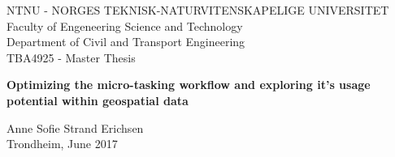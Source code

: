 \begin{titlepage}
\vspace * {-4cm}	
	NTNU - NORGES TEKNISK-NATURVITENSKAPELIGE UNIVERSITET\\
	Faculty of Engeneering Science and Technology\\
	Department of Civil and Transport Engineering\\
	TBA4925 - Master Thesis
	
\begin{center}

\vspace * {4cm}
\huge \textbf{Optimizing the micro-tasking workflow and exploring it's usage potential within geospatial data}

\vspace * {2cm}

\large
Anne Sofie Strand Erichsen \\ Trondheim, June 2017
\end{center}

\end{titlepage}